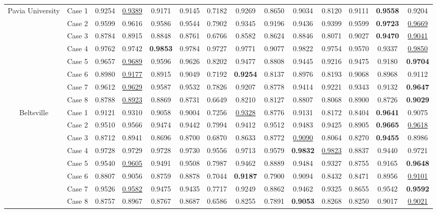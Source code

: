 \begin{table*}[t]
\begin{center}
{\begin{tabular}{cc cccccccccccc}
				\multirow{8}{*}{Pavia University} 
				& Case 1 & 
				0.9254 & \underline{0.9389} & 0.9171 & 0.9145 & 0.7182 & 0.9269 & 0.8650 & 0.9034 & 0.8120 & 0.9111 & \textbf{0.9558} & 0.9204 \\ 
				& Case 2 & 
				0.9599 & 0.9616 & 0.9586 & 0.9544 & 0.7902 & 0.9345 & 0.9196 & 0.9436 & 0.9399 & 0.9599 & \textbf{0.9723} & \underline{0.9669} \\ 
				& Case 3 & 
				0.8784 & 0.8915 & 0.8848 & 0.8761 & 0.6766 & 0.8582 & 0.8624 & 0.8846 & 0.8071 & 0.9027 & \textbf{0.9470} & \underline{0.9041} \\ 
				& Case 4 & 
				0.9762 & 0.9742 & \textbf{0.9853} & 0.9784 & 0.9727 & 0.9771 & 0.9077 & 0.9822 & 0.9754 & 0.9570 & 0.9337 & \underline{0.9850} \\ 
				& Case 5 & 
				0.9657 & \underline{0.9689} & 0.9596 & 0.9626 & 0.8202 & 0.9477 & 0.8808 & 0.9445 & 0.9216 & 0.9475 & 0.9180 & \textbf{0.9704} \\ 
				& Case 6 & 
				0.8980 & \underline{0.9177} & 0.8915 & 0.9049 & 0.7192 & \textbf{0.9254} & 0.8137 & 0.8976 & 0.8193 & 0.9068 & 0.8968 & 0.9112 \\ 
				& Case 7 & 
				0.9612 & \underline{0.9629} & 0.9587 & 0.9532 & 0.7826 & 0.9207 & 0.8778 & 0.9414 & 0.9221 & 0.9343 & 0.9132 & \textbf{0.9647} \\ 
				& Case 8 & 
				0.8788 & \underline{0.8923} & 0.8869 & 0.8731 & 0.6649 & 0.8210 & 0.8127 & 0.8807 & 0.8068 & 0.8900 & 0.8726 & \textbf{0.9029} \\ 

				\cmidrule(lr){1-14} 

				\multirow{8}{*}{Beltsville} 
				& Case 1 & 
				0.9121 & 0.9310 & 0.9058 & 0.9004 & 0.7256 & \underline{0.9328} & 0.8776 & 0.9131 & 0.8172 & 0.8404 & \textbf{0.9641} & 0.9075 \\ 
				& Case 2 & 
				0.9510 & 0.9566 & 0.9474 & 0.9442 & 0.7994 & 0.9412 & 0.9512 & 0.9483 & 0.9425 & 0.8905 & \textbf{0.9665} & \underline{0.9618} \\ 
				& Case 3 & 
				0.8712 & 0.8941 & 0.8696 & 0.8700 & 0.6870 & 0.8633 & 0.8772 & \underline{0.9090} & 0.8064 & 0.8270 & \textbf{0.9455} & 0.8986 \\ 
				& Case 4 & 
				0.9728 & 0.9729 & 0.9728 & 0.9730 & 0.9556 & 0.9713 & 0.9579 & \textbf{0.9832} & \underline{0.9823} & 0.8837 & 0.9440 & 0.9721 \\ 
				& Case 5 & 
				0.9540 & \underline{0.9605} & 0.9491 & 0.9508 & 0.7987 & 0.9462 & 0.8889 & 0.9484 & 0.9327 & 0.8755 & 0.9165 & \textbf{0.9648} \\ 
				& Case 6 & 
				0.8807 & 0.9056 & 0.8759 & 0.8878 & 0.7044 & \textbf{0.9187} & 0.7900 & 0.9094 & 0.8432 & 0.8471 & 0.8956 & \underline{0.9101} \\ 
				& Case 7 & 
				0.9526 & \underline{0.9582} & 0.9475 & 0.9435 & 0.7717 & 0.9249 & 0.8862 & 0.9462 & 0.9325 & 0.8655 & 0.9542 & \textbf{0.9592} \\ 
				& Case 8 & 
				0.8757 & 0.8967 & 0.8767 & 0.8687 & 0.6586 & 0.8255 & 0.7891 & \textbf{0.9053} & 0.8268 & 0.8250 & 0.9017 & \underline{0.9021} \\ 


\end{tabular}}
\end{center}
\end{table*}
